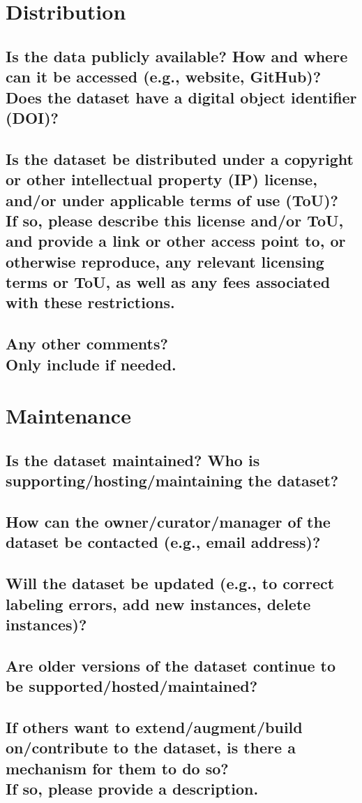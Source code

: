 \documentclass[letterpaper, 10 pt, conference]{ieeeconf}  %
\newcommand{\subtitle}[1]{{\\ \small \normalfont \color{purple} #1}}
\begin{document}
\section{Distribution}

\subsection{Is the data publicly available? How and where can it be accessed (e.g., website, GitHub)? \subtitle{Does the dataset have a digital object identifier (DOI)?}}

\subsection{Is the dataset be distributed under a copyright or other intellectual property (IP) license, and/or under applicable terms of use (ToU)? \subtitle{If so, please describe this license and/or ToU, and provide a link or other access point to, or otherwise reproduce, any relevant licensing terms or ToU, as well as any fees associated with these restrictions.}}

\subsection{Any other comments?
\subtitle{Only include if needed.}}

\section{Maintenance}

\subsection{Is the dataset maintained? Who is supporting/hosting/maintaining the dataset?}


\subsection{How can the owner/curator/manager of the dataset be contacted (e.g., email address)?}


\subsection{Will the dataset be updated (e.g., to correct labeling errors, add new instances, delete instances)?}


\subsection{Are older versions of the dataset continue to be supported/hosted/maintained?}


\subsection{If others want to extend/augment/build on/contribute to the dataset, is there a mechanism for them to do so? \subtitle{If so, please provide a description.}}


\medskip
 
  

\end{document}
